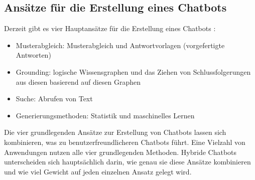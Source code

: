 \subsection{Ansätze für die Erstellung eines Chatbots}\label{sec:ansaetze_erstellung_chatbots}
Derzeit gibt es vier Hauptansätze für die Erstellung eines Chatbots \cite{lane_natural_2019}:
\begin{itemize}
    \item Musterabgleich: Musterabgleich und Antwortvorlagen (vorgefertigte Antworten)
    \item Grounding: logische Wissensgraphen und das Ziehen von Schlussfolgerungen aus diesen basierend auf diesen Graphen
    \item Suche: Abrufen von Text
    \item Generierungsmethoden: Statistik und maschinelles Lernen
\end{itemize}
Die vier grundlegenden Ansätze zur Erstellung von Chatbots lassen sich kombinieren, was zu benutzerfreundlicheren Chatbots führt. 
Eine Vielzahl von Anwendungen nutzen alle vier grundlegenden Methoden. 
Hybride Chatbots unterscheiden sich hauptsächlich darin, wie genau sie diese Ansätze kombinieren und wie viel Gewicht auf jeden einzelnen Ansatz gelegt wird.
